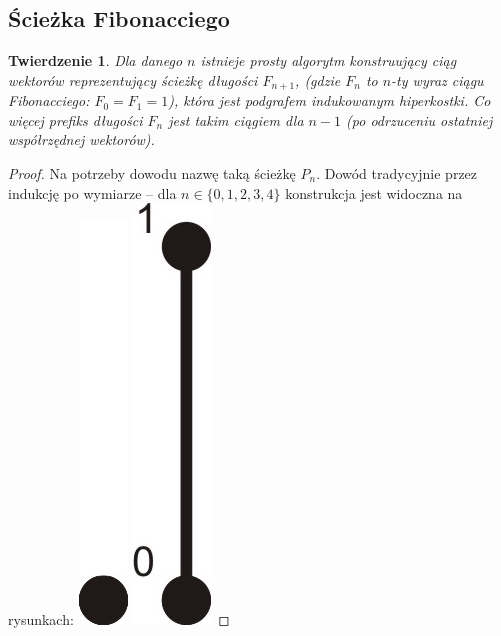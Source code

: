 \documentclass{pracamgr}
\newtheorem{theorem}{Twierdzenie}
\begin{document}
   \subsection{Ścieżka Fibonacciego}
    \begin{theorem}\label{co najmniej fibo}
     Dla danego $n$ istnieje prosty algorytm konstruujący ciąg wektorów reprezentujący ścieżkę długości $F_{n+1}$,
     (gdzie $F_n$ to $n$-ty wyraz ciągu Fibonacciego: $F_0=F_1=1$), która jest podgrafem indukowanym hiperkostki.
     Co więcej prefiks długości $F_{n}$ jest takim ciągiem dla $n-1$ (po odrzuceniu ostatniej współrzędnej wektorów).
    \end{theorem}
    \begin{proof}%
     Na potrzeby dowodu nazwę taką ścieżkę $P_n$.
     Dowód tradycyjnie przez indukcję po wymiarze -- dla $n\in\{0,1,2,3,4\}$ konstrukcja jest widoczna na rysunkach:\newline
     \hspace*{0pt}\includegraphics[scale=0.6]{img/Q0_long_path.jpg}
     \hspace*{12pt}\includegraphics[scale=0.6]{img/Q1_long_path.jpg}

\end{proof}
\end{document}
